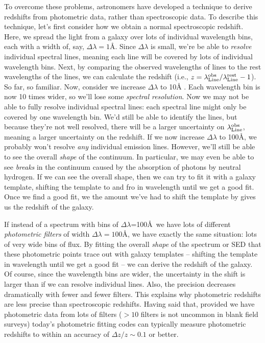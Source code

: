 \documentclass[11pt]{article}
\begin{document}
To overcome these problems, astronomers have developed a technique to
derive redshifts from photometric data, rather than spectroscopic
data. To describe this technique, let's first consider how we obtain a
normal spectroscopic redshift. Here, we spread the light from a galaxy
over lots of individual wavelength bins, each with a width of, say,
$\Delta\lambda=1$\AA . Since $\Delta\lambda$ is small, we're be able to
{\it resolve} individual spectral lines, meaning each line will be
covered by lots of individual wavelength bins. Next, by comparing the
observed wavelengths of lines to the rest wavelengths of the lines, we
can calculate the redshift (i.e.,
$z=\lambda_{\rm Line}^{\rm obs}/\lambda_{\rm Line}^{\rm rest} -1$). So
far, so familiar. Now, consider we increase $\Delta\lambda$ to 10\AA
. Each wavelength bin is now 10 times wider, so we'll lose some {\it
  spectral resolution}. Now we may not be able to fully resolve
individual spectral lines: each spectral line might only be covered by
one wavelength bin. We'd still be able to identify the lines, but
because they're not well resolved, there will be a larger uncertainty
on $\lambda_{\rm Line}^{\rm obs}$, meaning a larger uncertainty on the
redshift. If we now increase $\Delta\lambda$ to 100\AA , we probably
won't resolve {\it any} individual emission lines. However, we'll still
be able to see the overall {\it shape} of the continuum. In
particular, we may even be able to see {\it breaks} in the continuum
caused by the absorption of photons by neutral hydrogen. If we can see
the overall shape, then we can try to fit it with a galaxy template,
shifting the template to and fro in wavelength until we get a good
fit. Once we find a good fit, we the amount we've had to shift the
template by gives us the redshift of the galaxy.

If instead of a spectrum with bins of $\Delta\lambda$=100\AA\ we have
lots of different {\it photometric filters} of width $\Delta\lambda=100$\AA ,
we have exactly the same situation: lots of very wide bins of flux. By
fitting the overall {\it shape} of the spectrum or SED that these
photometric points trace out with galaxy templates -- shifting the
template in wavelength until we get a good fit -- we can derive the
redshift of the galaxy. Of course, since the wavelength bins are
wider, the uncertainty in the shift is larger than if we can resolve
individual lines. Also, the precision decreases dramatically with
fewer and fewer filters. This explains why photometric redshifts are
less precise than spectroscopic redshifts. Having said that, provided
we have photometric data from lots of filters ($>10$ filters is not
uncommon in blank field surveys) today's photometric fitting codes can
typically measure photometric redshifts to within an accuracy of
$\Delta z/z\sim 0.1$ or better.
\end{document}
